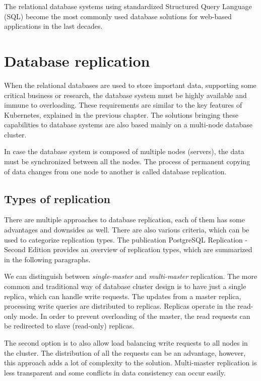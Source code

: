 \documentclass[
  digital, %
  twoside, %
  table,   %
  lof,     %
  lot,     %
]{fithesis3}
\begin{document}
The relational database systems using standardized Structured Query Language (SQL) \cite{sql_standard} become the most commonly used database solutions for web-based applications in the last decades.

\section{Database replication} \label{sec:db_replication}
When the relational databases are used to store important data, supporting some critical business or research, the database system must be highly available and immune to overloading. These requirements are similar to the key features of Kubernetes, explained in the previous chapter. The solutions bringing these capabilities to database systems are also based mainly on a multi-node database cluster.

In case the database system is composed of multiple nodes (servers), the data must be synchronized between all the nodes. The process of permanent copying of data changes from one node to another is called database replication.

\subsection{Types of replication} \label{sec:types_of_replication}
There are multiple approaches to database replication, each of them has some advantages and downsides as well. There are also various criteria, which can be used to categorize replication types. The publication PostgreSQL Replication - Second Edition \cite{pg} provides an overview of replication types, which are summarized in the following paragraphs.

We can distinguish between \textit{single-master} and  \textit{multi-master} replication. The more common and traditional way of database cluster design is to have just a single replica, which can handle write requests. The updates from a master replica, processing write queries are distributed to replicas. Replicas operate in the read-only mode. In order to prevent overloading of the master, the read requests can be redirected to slave (read-only) replicas.

The second option is to also allow load balancing write requests to all nodes in the cluster. The distribution of all the requests can be an advantage, however, this approach adds a lot of complexity to the solution. Multi-master replication is less transparent and some conflicts in data consistency can occur easily.
\end{document}
